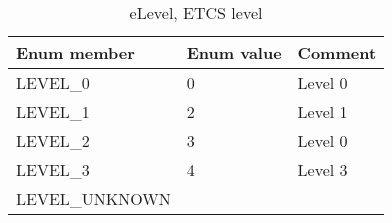 \documentclass{template/openetcs_article}
\begin{document}
\begin{longtable}{|l|l|l|}
	\caption{eLevel, ETCS level} \\ 
	\hline
		\begin{minipage}[t]{0.45\linewidth} \textbf{Enum member}	\end{minipage}
	&	\begin{minipage}[t]{0.10\linewidth} \textbf{Enum value}	\end{minipage} 
	&	\begin{minipage}[t]{0.50\linewidth} \textbf{Comment} \end{minipage} \\
	\hline
		\begin{minipage}[t]{0.45\linewidth} LEVEL\_0 \end{minipage} 
	&	\begin{minipage}[t]{0.10\linewidth} 0 \end{minipage} 
	&	\begin{minipage}[t]{0.50\linewidth} Level 0 \end{minipage}\\
	\hline
		\begin{minipage}[t]{0.45\linewidth} LEVEL\_1 \end{minipage} 
	&	\begin{minipage}[t]{0.10\linewidth} 2 \end{minipage} 
	&	\begin{minipage}[t]{0.50\linewidth} Level 1 \end{minipage}\\
	\hline
		\begin{minipage}[t]{0.45\linewidth} LEVEL\_2 \end{minipage} 
	&	\begin{minipage}[t]{0.10\linewidth} 3 \end{minipage} 
	&	\begin{minipage}[t]{0.50\linewidth} Level 0 \end{minipage}\\
	\hline
		\begin{minipage}[t]{0.45\linewidth} LEVEL\_3 \end{minipage} 
	&	\begin{minipage}[t]{0.10\linewidth} 4 \end{minipage} 
	&	\begin{minipage}[t]{0.50\linewidth} Level 3 \end{minipage}\\
	\hline
		\begin{minipage}[t]{0.45\linewidth} LEVEL\_UNKNOWN \end{minipage} 

\end{longtable}
\end{document}
